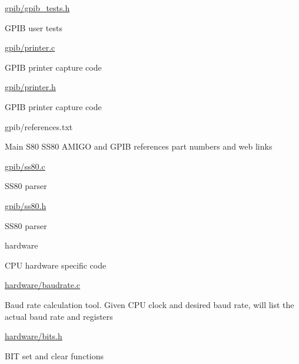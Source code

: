 \begin{DoxyItemize}
\begin{DoxyItemize}
\begin{DoxyItemize}
\end{DoxyItemize}
\item \hyperlink{gpib__tests_8h}{gpib/gpib\+\_\+tests.\+h}
\begin{DoxyItemize}
\item G\+P\+IB user tests
\end{DoxyItemize}
\item \hyperlink{printer_8c}{gpib/printer.\+c}
\begin{DoxyItemize}
\item G\+P\+IB printer capture code
\end{DoxyItemize}
\item \hyperlink{printer_8h}{gpib/printer.\+h}
\begin{DoxyItemize}
\item G\+P\+IB printer capture code
\end{DoxyItemize}
\item gpib/references.\+txt
\begin{DoxyItemize}
\item Main S80 S\+S80 A\+M\+I\+GO and G\+P\+IB references part numbers and web links
\end{DoxyItemize}
\item \hyperlink{ss80_8c}{gpib/ss80.\+c}
\begin{DoxyItemize}
\item S\+S80 parser
\end{DoxyItemize}
\item \hyperlink{ss80_8h}{gpib/ss80.\+h}
\begin{DoxyItemize}
\item S\+S80 parser
\end{DoxyItemize}
\end{DoxyItemize}
\item hardware
\begin{DoxyItemize}
\item C\+PU hardware specific code
\item \hyperlink{baudrate_8c}{hardware/baudrate.\+c}
\begin{DoxyItemize}
\item Baud rate calculation tool. Given C\+PU clock and desired baud rate, will list the actual baud rate and registers
\end{DoxyItemize}
\item \hyperlink{bits_8h}{hardware/bits.\+h}
\begin{DoxyItemize}
\item B\+IT set and clear functions
\end{DoxyItemize}

\end{DoxyItemize}
\end{DoxyItemize}
